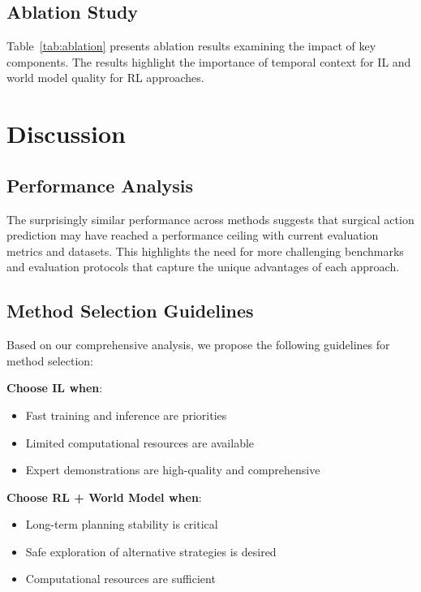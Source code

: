 \documentclass[conference]{IEEEtran}
\begin{document}
\subsection{Ablation Study}

Table~\ref{tab:ablation} presents ablation results examining the impact of key components. The results highlight the importance of temporal context for IL and world model quality for RL approaches.



\section{Discussion}

\subsection{Performance Analysis}

The surprisingly similar performance across methods suggests that surgical action prediction may have reached a performance ceiling with current evaluation metrics and datasets. This highlights the need for more challenging benchmarks and evaluation protocols that capture the unique advantages of each approach.

\subsection{Method Selection Guidelines}

Based on our comprehensive analysis, we propose the following guidelines for method selection:

\textbf{Choose IL when}:
\begin{itemize}
\item Fast training and inference are priorities
\item Limited computational resources are available
\item Expert demonstrations are high-quality and comprehensive
\end{itemize}

\textbf{Choose RL + World Model when}:
\begin{itemize}
\item Long-term planning stability is critical
\item Safe exploration of alternative strategies is desired
\item Computational resources are sufficient
\end{itemize}
\end{document}
